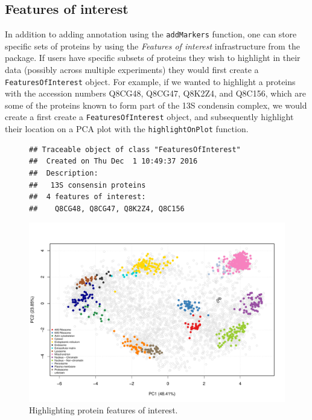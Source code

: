 \subsection*{Features of interest}
In addition to adding annotation using the \texttt{addMarkers}
function, one can store specific sets of proteins by using the
\textit{Features of interest} infrastructure from the
 package. If users have specific subsets of proteins
they wish to highlight in their data (possibly across multiple
experiments) they would first create a \texttt{FeaturesOfInterest}
object. For example, if we wanted to highlight a proteins with the
accession numbers Q8CG48, Q8CG47, Q8K2Z4, and Q8C156, which are some
of the proteins known to form part of the 13S condensin complex, we
would create a first create a \texttt{FeaturesOfInterest} object, and
subsequently highlight their location on a PCA plot with the
\texttt{highlightOnPlot} function.

\begin{figure}[!ht]
  \centering
\begin{knitrout}
\color{fgcolor}\begin{kframe}
\begin{alltt}
 \hlkwb{<-} \hlstd{(}\hlstd{,} \hlstd{,} \hlstd{,} \hlstd{)}
 \hlkwb{<-} \hlstd{(} \hlstd{=} \hlstd{,}
                              
                              
\end{alltt}
\begin{verbatim}
## Traceable object of class "FeaturesOfInterest"
##  Created on Thu Dec  1 10:49:37 2016 
##  Description:
##   13S consensin proteins
##  4 features of interest:
##    Q8CG48, Q8CG47, Q8K2Z4, Q8C156
\end{verbatim}
\begin{alltt}
  \hlstd{=} \hlstd{)}
\end{alltt}
\end{kframe}
\includegraphics[width=.8\textwidth]{figure/foi-1} 

\end{knitrout}
  \caption{Highlighting protein features of interest.}
  \label{fig:foi}
\end{figure}

